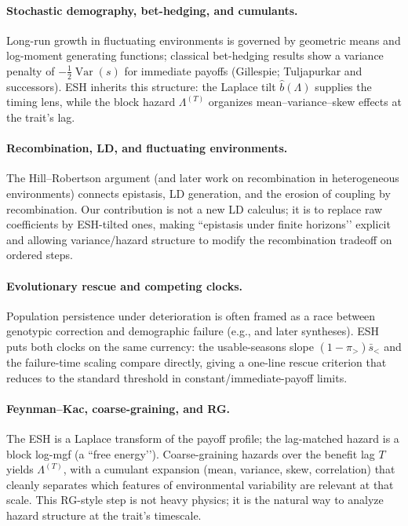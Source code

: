 \documentclass[11pt]{article}
\theoremstyle{upright}
\newcommand{\Var}{\operatorname{Var}}
\newcommand{\hazT}[1]{\Lambda^{(#1)}}          %
\begin{document}
\paragraph{Stochastic demography, bet-hedging, and cumulants.}
Long-run growth in fluctuating environments is governed by geometric means and log-moment generating functions; classical bet-hedging results show a variance penalty of $-\tfrac12\Var(s)$ for immediate payoffs (Gillespie; Tuljapurkar \citep{Tuljapurkar1982} and successors). ESH inherits this structure: the Laplace tilt $\widehat b(\Lambda)$ supplies the timing lens, while the block hazard $\hazT{T}$ organizes mean–variance–skew effects at the trait’s lag.

\paragraph{Recombination, LD, and fluctuating environments.}
The Hill–Robertson argument\citep{HillRobertson1966} (and later work on recombination in heterogeneous environments) connects epistasis, LD generation, and the erosion of coupling by recombination. Our contribution is not a new LD calculus; it is to replace raw coefficients by ESH-tilted ones, making “epistasis under finite horizons’’ explicit and allowing variance/hazard structure to modify the recombination tradeoff on ordered steps.

\paragraph{Evolutionary rescue and competing clocks.}
Population persistence under deterioration is often framed as a race between genotypic correction and demographic failure (e.g., \citet{Gomulkiewicz1995} and later syntheses). ESH puts both clocks on the same currency: the usable-seasons slope $(1-\pi_>)\bar s_{<}$ and the failure-time scaling compare directly, giving a one-line rescue criterion that reduces to the standard threshold in constant/immediate-payoff limits.

\paragraph{Feynman--Kac, coarse-graining, and RG.}
The ESH is a Laplace transform of the payoff profile; the lag-matched hazard is a block log-mgf (a “free energy’’). Coarse-graining hazards over the benefit lag $T$ yields $\hazT{T}$, with a cumulant expansion (mean, variance, skew, correlation) that cleanly separates which features of environmental variability are relevant at that scale. This RG-style step is not heavy physics; it is the natural way to analyze hazard structure at the trait’s timescale.
\end{document}
